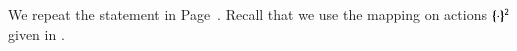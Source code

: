 


We repeat the statement in Page~\pageref{prop:op_corr_HOp_to_p}. 
Recall that we use the mapping on actions $\{\!\!\{\cdot\}\!\!\}^{\mathtt{2}}$ given in .

\begin{proposition}\myrm
	\label{app:prop:op_corr_HOp_to_p}

\end{proposition}


